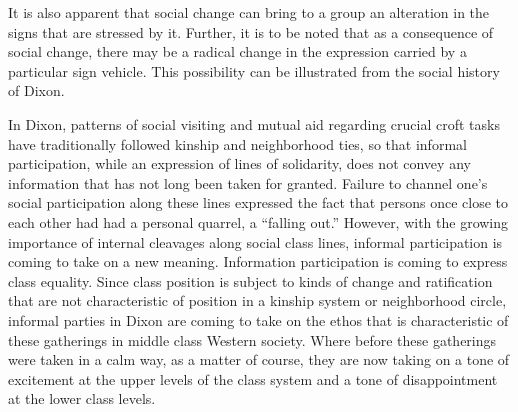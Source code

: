 \documentclass[openany,nobib]{tufte-book}
\begin{document}
It is also apparent that social change can bring to a group an
alteration in the signs that are stressed by it. Further, it is to be
noted that as a consequence of social change, there may be a radical
change in the expression carried by a particular sign vehicle. This
possibility can be illustrated from the social history of Dixon.

In Dixon, patterns of social visiting and mutual aid regarding crucial
croft tasks have traditionally followed kinship and neighborhood ties,
so that informal participation, while an expression of lines of
solidarity, does not convey any information that has not long been taken
for granted. Failure to channel one's social participation along these
lines expressed the fact that persons once close to each other had had a
personal quarrel, a ``falling out.'' However, with the growing
importance of internal cleavages along social class lines, informal
participation is coming to take on a new meaning. Information
participation is coming to express class equality. Since class position
is subject to kinds of change and ratification that are not
characteristic of position in a kinship system or neighborhood circle,
informal parties in Dixon are coming to take on the ethos that is
characteristic of these gatherings in middle class Western society.
Where before these gatherings were taken in a calm way, as a matter of
course, they are now taking on a tone of excitement at the upper levels
of the class system and a tone of disappointment at the lower class
levels.
\end{document}
